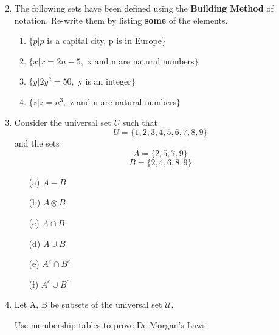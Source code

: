 \documentclass[a4paper,12pt]{article}
\begin{document}
\begin{enumerate}
\begin{multicols}{3}
\begin{itemize}
\end{itemize}
\end{multicols}
\item 
The following sets have been defined using the \textbf{Building Method} of notation. Re-write them by listing \textbf{some} of the elements.
\begin{enumerate}
\item $\{p | p$ is a capital city, p is in Europe$\}$
\item $\{x | x = 2n - 5,$ x and n are natural numbers$\}$
\item $\{y | 2y^2 = 50,$ y is an integer$\}$
\item $\{z | z = n^3,$ z and n are natural numbers$\}$
\end{enumerate}


\item 
Consider the universal set $U$ such that
\[U=\{1,2,3,4,5,6,7,8,9\} \]
and the sets
\[A=\{2,5,7,9\} \]
\[B=\{2,4,6,8,9\} \]
\begin{multicols}{2}
\begin{itemize}
	\item[(a)] $A-B$
	\item[(b)] $A \otimes B$
	\item[(c)] $A \cap B$
	\item[(d)] $A \cup B$
	\item[(e)] $A^{c} \cap B^{c}$
	\item[(f)] $A^{c} \cup B^{c}$
\end{itemize}
\end{multicols}


\item Let A, B be subsets of the universal set $\mathcal{U}$.

Use membership tables to prove De Morgan's Laws.

\end{enumerate}
\end{document}
